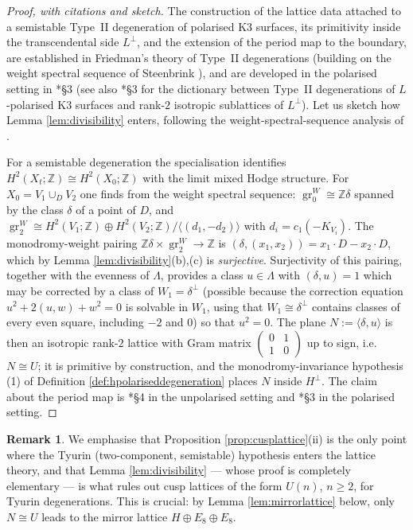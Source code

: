 \documentclass[11pt]{amsart}
\theoremstyle{plain}
\theoremstyle{definition}
\newtheorem{remark}[theorem]{Remark}
\newcommand{\Z}{\mathbb{Z}}
\newcommand{\Lam}{\Lambda}
\begin{document}
\begin{proof}[Proof, with citations and sketch]
The construction of the lattice data attached to a semistable Type~II
degeneration of polarised K3 surfaces, its primitivity inside the transcendental
side $L^\perp$, and the extension of the period map to the boundary, are
established in Friedman's theory of Type~II degenerations \cite{Fri83} (building
on the weight spectral sequence of Steenbrink \cite{Ste77}), and are developed
in the polarised setting in \cite{dfk3slpms}*{\S 3} (see also
\cite{DPT24}*{\S 3} for the dictionary between Type~II degenerations of
$L$-polarised K3 surfaces and rank-$2$ isotropic sublattices of $L^\perp$).
Let us sketch how Lemma \ref{lem:divisibility} enters, following the
weight-spectral-sequence analysis of \cite{Ste77,Fri83}.

For a semistable degeneration the specialisation identifies
$H^2(X_t;\Z)\cong H^2(X_0;\Z)$ with the limit mixed Hodge structure. For
$X_0=V_1\cup_D V_2$ one finds from the weight spectral sequence:
$\operatorname{gr}^W_0\cong\Z\delta$ spanned by the class $\delta$ of a point
of $D$, and
$\operatorname{gr}^W_2\cong H^2(V_1;\Z)\oplus H^2(V_2;\Z)/\langle(d_1,-d_2)\rangle$
with $d_i=c_1(-K_{V_i})$. The monodromy-weight pairing
$\Z\delta\times \operatorname{gr}^W_2\to\Z$ is
$(\delta,(x_1,x_2))=x_1\cdot D-x_2\cdot D$, which by
Lemma \ref{lem:divisibility}(b),(c) is \emph{surjective}. Surjectivity of this
pairing, together with the evenness of $\Lam$, provides a class $u\in\Lam$ with
$(\delta,u)=1$ which may be corrected by a class of
$W_1=\delta^\perp$ (possible because the correction equation
$u^2+2(u,w)+w^2=0$ is solvable in $W_1$, using that $W_1\cong\delta^\perp$
contains classes of every even square, including $-2$ and $0$) so that
$u^2=0$. The plane $N:=\langle\delta,u\rangle$ is then an isotropic rank-$2$
lattice with Gram matrix $\left(\begin{smallmatrix}0&1\\1&0\end{smallmatrix}\right)$
up to sign, i.e.\ $N\cong U$; it is primitive by construction, and the
monodromy-invariance hypothesis (1) of Definition
\ref{def:hpolariseddegeneration} places $N$ inside $H^\perp$. The claim about
the period map is \cite{Fri83}*{\S 4} in the unpolarised setting and
\cite{cmek3sspt,dfk3slpms}*{\S 3} in the polarised setting.
\end{proof}

\begin{remark}
We emphasise that Proposition \ref{prop:cusplattice}(ii) is the only point where
the Tyurin (two-component, semistable) hypothesis enters the lattice theory, and
that Lemma \ref{lem:divisibility} --- whose proof is completely elementary ---
is what rules out cusp lattices of the form $U(n)$, $n\geq 2$, for Tyurin
degenerations. This is crucial: by Lemma \ref{lem:mirrorlattice} below, only
$N\cong U$ leads to the mirror lattice $H\oplus E_8\oplus E_8$.
\end{remark}
\end{document}
